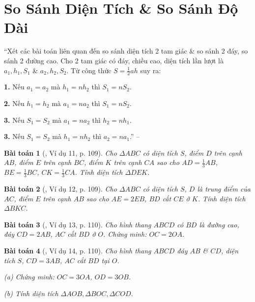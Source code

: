 \documentclass{article}
\numberwithin{equation}{section}
\newtheorem{baitoan}{Bài toán}[section]
\begin{document}

\section{So Sánh Diện Tích \& So Sánh Độ Dài}
``Xét các bài toán liên quan đến so sánh diện tích 2 tam giác \& so sánh 2 đáy, so sánh 2 đường cao. Cho 2 tam giác có đáy, chiều cao, diện tích lần lượt là $a_1,h_1,S_1$ \& $a_2,h_2,S_2$. Từ công thức $S = \frac{1}{2}ah$ suy ra:
\begin{enumerate*}
	\item[\textbf{1.}] Nếu $a_1 = a_2$ mà $h_1 = nh_2$ thì $S_1 = nS_2$.
	\item[\textbf{2.}] Nếu $h_1 = h_2$ mà $a_1 = na_2$ thì $S_1 = nS_2$.
	\item[\textbf{3.}] Nếu $S_1 = S_2$ mà $a_1 = na_2$ thì $h_2 = nh_1$.
	\item[\textbf{3.}] Nếu $S_1 = S_2$ mà $h_1 = nh_2$ thì $a_2 = na_1$.'' -- \cite[p. 109]{Binh_Toan_6_tap_1}
\end{enumerate*}

\begin{baitoan}[\cite{Binh_Toan_6_tap_1}, Ví dụ 11, p. 109]
	Cho $\Delta ABC$ có diện tích $S$, điểm $D$ trên cạnh $AB$, điểm $E$ trên cạnh $BC$, điểm $K$ trên cạnh $CA$ sao cho $AD = \frac{1}{3}AB$, $BE = \frac{1}{3}{BC}$, $CK = \frac{1}{3}CA$. Tính diện tích $\Delta DEK$.
\end{baitoan}

\begin{baitoan}[\cite{Binh_Toan_6_tap_1}, Ví dụ 12, p. 109]
	Cho $\Delta ABC$ có diện tích $S$, $D$ là trung điểm của $AC$, điểm $E$ trên cạnh $AB$ sao cho $AE = 2EB$, $BD$ cắt $CE$ ở $K$. Tính diện tích $\Delta BKC$.
\end{baitoan}

\begin{baitoan}[\cite{Binh_Toan_6_tap_1}, Ví dụ 13, p. 110]
	Cho hình thang $ABCD$ có $BD$ là đường cao, đáy $CD = 2AB$, $AC$ cắt $BD$ ở $O$. Chứng minh: $OC = 2OA$.
\end{baitoan}

\begin{baitoan}[\cite{Binh_Toan_6_tap_1}, Ví dụ 14, p. 110]
	Cho hình thang $ABCD$ đáy $AB$ \& $CD$, diện tích $S$, $CD = 3AB$, $AC$ cắt $BD$ tại $O$.
	\begin{enumerate*}
		\item[(a)] Chứng minh: $OC = 3OA$, $OD = 3OB$.
		\item[(b)] Tính diện tích $\Delta AOB,\Delta BOC,\Delta COD$.
	\end{enumerate*}
\end{baitoan}
\end{document}
